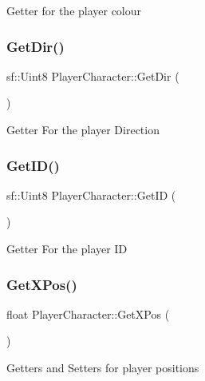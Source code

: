 Getter for the player colour \hypertarget{class_player_character_af6704dd235bd347fb3f2c59a56015b51}{}\label{class_player_character_af6704dd235bd347fb3f2c59a56015b51} 
\subsubsection{\texorpdfstring{Get\+Dir()}{GetDir()}}
{\footnotesize\ttfamily sf\+::\+Uint8 Player\+Character\+::\+Get\+Dir (\begin{DoxyParamCaption}{ }\end{DoxyParamCaption})\hspace{0.3cm}{\ttfamily [inline]}}

Getter For the player Direction \hypertarget{class_player_character_aa7be8bfe26290d285725f0035de6e31c}{}\label{class_player_character_aa7be8bfe26290d285725f0035de6e31c} 
\subsubsection{\texorpdfstring{Get\+I\+D()}{GetID()}}
{\footnotesize\ttfamily sf\+::\+Uint8 Player\+Character\+::\+Get\+ID (\begin{DoxyParamCaption}{ }\end{DoxyParamCaption})\hspace{0.3cm}{\ttfamily [inline]}}

Getter For the player ID \hypertarget{class_player_character_aaa03186b913d3ff5673dcde280284bf5}{}\label{class_player_character_aaa03186b913d3ff5673dcde280284bf5} 
\subsubsection{\texorpdfstring{Get\+X\+Pos()}{GetXPos()}}
{\footnotesize\ttfamily float Player\+Character\+::\+Get\+X\+Pos (\begin{DoxyParamCaption}{ }\end{DoxyParamCaption})\hspace{0.3cm}{\ttfamily [inline]}}

Getters and Setters for player positions \hypertarget{class_player_character_a666a4e7b2a642704d7435beaccb89e6a}{}\label{class_player_character_a666a4e7b2a642704d7435beaccb89e6a} 
